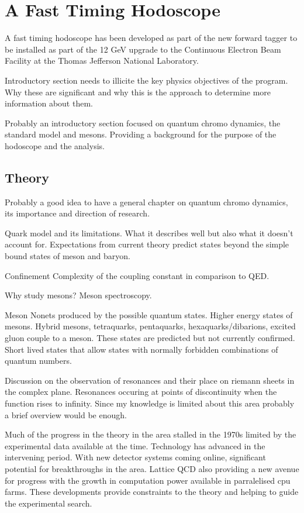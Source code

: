 \chapter{A Fast Timing Hodoscope}
A fast timing hodoscope has been developed as part of the new forward tagger to be installed as part of the 12 GeV upgrade to the Continuous Electron Beam Facility at the Thomas Jefferson National Laboratory.

Introductory section needs to illicite the key physics objectives of the program. Why these are significant and why this is the approach to determine more information about them.

Probably an introductory section focused on quantum chromo dynamics, the standard model and mesons. Providing a background for the purpose of the hodoscope and the analysis.
\section{Theory}
Probably a good idea to have a general chapter on quantum chromo dynamics, its importance and direction of research.

Quark model and its limitations. What it describes well but also what it doesn't account for. Expectations from current theory predict states beyond the simple bound states of meson and baryon.

Confinement
Complexity of the coupling constant in comparison to QED.

Why study mesons? Meson spectroscopy.

Meson Nonets produced by the possible quantum states.
Higher energy states of mesons.
Hybrid mesons, tetraquarks, pentaquarks, hexaquarks/dibarions, excited gluon couple to a meson. These states are predicted but not currently confirmed. Short lived states that allow states with normally forbidden combinations of quantum numbers.

Discussion on the observation of resonances and their place on riemann sheets in the complex plane. Resonances occuring at points of discontinuity when the function rises to infinity. Since my knowledge is limited about this area probably a brief overview would be enough.

Much of the progress in the theory in the area stalled in the 1970s limited by the experimental data available at the time. Technology has advanced in the intervening period. With new detector systems coming online, significant potential for breakthroughs in the area. Lattice QCD also providing a new avenue for progress with the growth in computation power available in parralelised cpu farms. These developments provide constraints to the theory and helping to guide the experimental search. 


